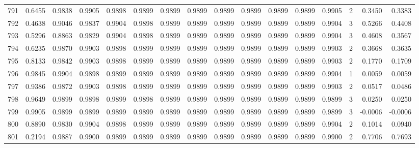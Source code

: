 \begin{tabular}{lrrrrrrrrrrrrrrr}
791 &      0.6455 &  0.9838 &  0.9905 &  0.9898 &  0.9899 &  0.9899 &  0.9899 &  0.9899 &  0.9899 &  0.9899 &   0.9899 &     0.9905 &      2 &                    0.3450 &                     0.3383 \\
792 &      0.4638 &  0.9046 &  0.9837 &  0.9904 &  0.9898 &  0.9899 &  0.9899 &  0.9899 &  0.9899 &  0.9899 &   0.9899 &     0.9904 &      3 &                    0.5266 &                     0.4408 \\
793 &      0.5296 &  0.8863 &  0.9829 &  0.9904 &  0.9898 &  0.9899 &  0.9899 &  0.9899 &  0.9899 &  0.9899 &   0.9899 &     0.9904 &      3 &                    0.4608 &                     0.3567 \\
794 &      0.6235 &  0.9870 &  0.9903 &  0.9898 &  0.9899 &  0.9899 &  0.9899 &  0.9899 &  0.9899 &  0.9899 &   0.9899 &     0.9903 &      2 &                    0.3668 &                     0.3635 \\
795 &      0.8133 &  0.9842 &  0.9903 &  0.9898 &  0.9899 &  0.9899 &  0.9899 &  0.9899 &  0.9899 &  0.9899 &   0.9899 &     0.9903 &      2 &                    0.1770 &                     0.1709 \\
796 &      0.9845 &  0.9904 &  0.9898 &  0.9899 &  0.9899 &  0.9899 &  0.9899 &  0.9899 &  0.9899 &  0.9899 &   0.9899 &     0.9904 &      1 &                    0.0059 &                     0.0059 \\
797 &      0.9386 &  0.9872 &  0.9903 &  0.9898 &  0.9899 &  0.9899 &  0.9899 &  0.9899 &  0.9899 &  0.9899 &   0.9899 &     0.9903 &      2 &                    0.0517 &                     0.0486 \\
798 &      0.9649 &  0.9899 &  0.9898 &  0.9899 &  0.9898 &  0.9899 &  0.9899 &  0.9899 &  0.9899 &  0.9899 &   0.9899 &     0.9899 &      3 &                    0.0250 &                     0.0250 \\
799 &      0.9905 &  0.9899 &  0.9899 &  0.9899 &  0.9899 &  0.9899 &  0.9899 &  0.9899 &  0.9899 &  0.9899 &   0.9899 &     0.9899 &      3 &                   -0.0006 &                    -0.0006 \\
800 &      0.8890 &  0.9830 &  0.9904 &  0.9898 &  0.9899 &  0.9899 &  0.9899 &  0.9899 &  0.9899 &  0.9899 &   0.9899 &     0.9904 &      2 &                    0.1014 &                     0.0940 \\
801 &      0.2194 &  0.9887 &  0.9900 &  0.9899 &  0.9899 &  0.9899 &  0.9899 &  0.9899 &  0.9899 &  0.9899 &   0.9899 &     0.9900 &      2 &                    0.7706 &                     0.7693 \\

\end{tabular}
